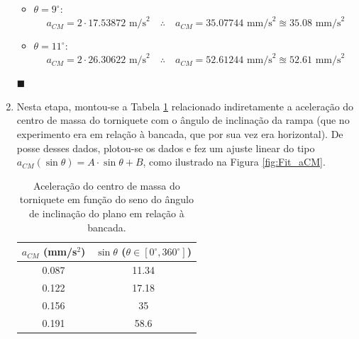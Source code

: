 \documentclass[12pt,a4paper]{article}
\begin{document}
\begin{enumerate}
\begin{itemize}
        \item $\theta=9^{\circ}$:
        \begin{equation} \label{eq:a_CM - theta_9}
            a_{CM}=2\cdot 17.53872\text{ m/s}^{2}\quad\therefore\quad \boxed{a_{CM}=35.07744\text{ mm/s}^{2}\approxeq 35.08\text{ mm/s}^{2}}
        \end{equation}

        \item $\theta=11^{\circ}$:
        \begin{equation} \label{eq:a_CM - theta1_11}
            a_{CM}=2\cdot 26.30622\text{ m/s}^{2}\quad\therefore\quad \boxed{a_{CM}=52.61244\text{ mm/s}^{2}\approxeq 52.61\text{ mm/s}^{2}}
        \end{equation}
        
    \end{itemize}
    \begin{flushright}
        $\blacksquare$
    \end{flushright}
    


    \item Nesta etapa, montou-se a Tabela \ref{tab:Atividade3-5} relacionado indiretamente a aceleração do centro de massa do torniquete com o ângulo de inclinação da rampa (que no experimento era em relação à bancada, que por sua vez era horizontal). De posse desses dados, plotou-se os dados e fez um ajuste linear do tipo $a_{CM}(\sin{\theta})=A\cdot\sin{\theta}+B$, como ilustrado na Figura \ref{fig:Fit_aCM}.

    \begin{table}[htb!]
        \centering
        \caption{Aceleração do centro de massa do torniquete em função do seno do ângulo de inclinação do plano em relação à bancada.}
        \begin{tabular}{|c|c|}
            \hline
            $a_{CM}$ (mm/s$^{2}$) & $\sin{\theta}$ ($\theta\in[0^{\circ},360^{\circ}]$) \\
            \hline
            0.087 & 11.34 \\
            0.122 & 17.18 \\
            0.156 & 35 \\
            0.191 & 58.6 \\
            \hline
        \end{tabular}
        \label{tab:Atividade3-5}
    \end{table}


\end{enumerate}
\end{document}
